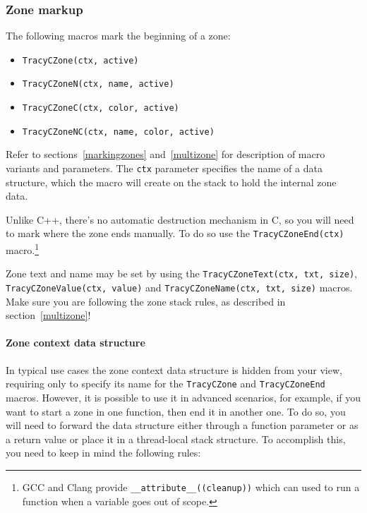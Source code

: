 \documentclass[hidelinks,titlepage,a4paper,twoside]{article}
\begin{document}
\subsubsection{Zone markup}
\label{czonemarkup}

The following macros mark the beginning of a zone:

\begin{itemize}
\item \texttt{TracyCZone(ctx, active)}
\item \texttt{TracyCZoneN(ctx, name, active)}
\item \texttt{TracyCZoneC(ctx, color, active)}
\item \texttt{TracyCZoneNC(ctx, name, color, active)}
\end{itemize}

Refer to sections~\ref{markingzones} and~\ref{multizone} for description of macro variants and parameters. The \texttt{ctx} parameter specifies the name of a data structure, which the macro will create on the stack to hold the internal zone data.

Unlike C++, there's no automatic destruction mechanism in C, so you will need to mark where the zone ends manually. To do so use the \texttt{TracyCZoneEnd(ctx)} macro.\footnote{GCC and Clang provide \texttt{\_\_attribute\_\_((cleanup))} which can used to run a function when a variable goes out of scope.}

Zone text and name may be set by using the \texttt{TracyCZoneText(ctx, txt, size)}, \texttt{TracyCZoneValue(ctx, value)} and \texttt{TracyCZoneName(ctx, txt, size)} macros. Make sure you are following the zone stack rules, as described in section~\ref{multizone}!

\paragraph{Zone context data structure}
\label{zonectx}

In typical use cases the zone context data structure is hidden from your view, requiring only to specify its name for the \texttt{TracyCZone} and \texttt{TracyCZoneEnd} macros. However, it is possible to use it in advanced scenarios, for example, if you want to start a zone in one function, then end it in another one. To do so, you will need to forward the data structure either through a function parameter or as a return value or place it in a thread-local stack structure. To accomplish this, you need to keep in mind the following rules:
\end{document}
